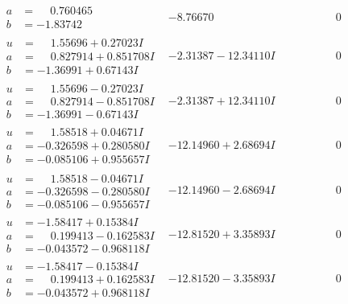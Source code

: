 \documentclass[1p]{elsarticle_modified}
\theoremstyle{definition}
\begin{document}
$$\begin{array}{c|c|c}
\begin{aligned}
a &= \phantom{-}0.760465\phantom{ +0.000000I} \\
b &= -1.83742\phantom{ +0.000000I}\end{aligned}
 & -8.76670\phantom{ +0.000000I} & \phantom{-0.000000 } 0 \\ \hline\begin{aligned}
u &= \phantom{-}1.55696 + 0.27023 I \\
a &= \phantom{-}0.827914 + 0.851708 I \\
b &= -1.36991 + 0.67143 I\end{aligned}
 & -2.31387 - 12.34110 I & \phantom{-0.000000 } 0 \\ \hline\begin{aligned}
u &= \phantom{-}1.55696 - 0.27023 I \\
a &= \phantom{-}0.827914 - 0.851708 I \\
b &= -1.36991 - 0.67143 I\end{aligned}
 & -2.31387 + 12.34110 I & \phantom{-0.000000 } 0 \\ \hline\begin{aligned}
u &= \phantom{-}1.58518 + 0.04671 I \\
a &= -0.326598 + 0.280580 I \\
b &= -0.085106 + 0.955657 I\end{aligned}
 & -12.14960 + 2.68694 I & \phantom{-0.000000 } 0 \\ \hline\begin{aligned}
u &= \phantom{-}1.58518 - 0.04671 I \\
a &= -0.326598 - 0.280580 I \\
b &= -0.085106 - 0.955657 I\end{aligned}
 & -12.14960 - 2.68694 I & \phantom{-0.000000 } 0 \\ \hline\begin{aligned}
u &= -1.58417 + 0.15384 I \\
a &= \phantom{-}0.199413 - 0.162583 I \\
b &= -0.043572 - 0.968118 I\end{aligned}
 & -12.81520 + 3.35893 I & \phantom{-0.000000 } 0 \\ \hline\begin{aligned}
u &= -1.58417 - 0.15384 I \\
a &= \phantom{-}0.199413 + 0.162583 I \\
b &= -0.043572 + 0.968118 I\end{aligned}
 & -12.81520 - 3.35893 I & \phantom{-0.000000 } 0 \\ \hline\begin{aligned}

\end{aligned}
\end{array}$$
\end{document}
